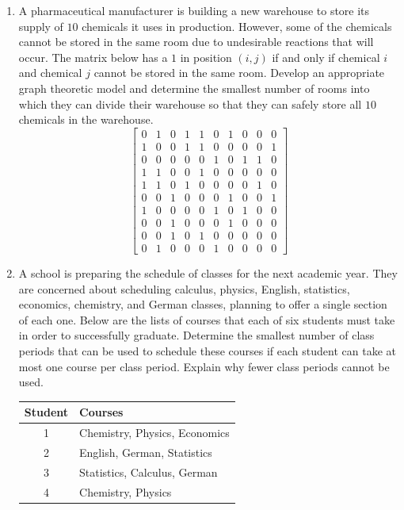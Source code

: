 \begin{enumerate}
\item A pharmaceutical manufacturer is building a new warehouse to
  store its supply of $10$ chemicals it uses in production. However,
  some of the chemicals cannot be stored in the same room due to undesirable
  reactions that will occur. The matrix below has a $1$ in position
  $(i,j)$ if and only if chemical $i$ and chemical $j$ cannot be
  stored in the same room. Develop an appropriate graph theoretic
  model and determine the smallest number of rooms into which they can
  divide their warehouse so that they can safely store all $10$
  chemicals in the warehouse.
  \[
  \begin{bmatrix}
    0 & 1 & 0 & 1 & 1 & 0 & 1 & 0 & 0 & 0\\
    1 & 0 & 0 & 1 & 1 & 0 & 0 & 0 & 0 & 1\\
    0 & 0 & 0 & 0 & 0 & 1 & 0 & 1 & 1 & 0\\
    1 & 1 & 0 & 0 & 1 & 0 & 0 & 0 & 0 & 0\\
    1 & 1 & 0 & 1 & 0 & 0 & 0 & 0 & 1 & 0\\
    0 & 0 & 1 & 0 & 0 & 0 & 1 & 0 & 0 & 1\\
    1 & 0 & 0 & 0 & 0 & 1 & 0 & 1 & 0 & 0\\
    0 & 0 & 1 & 0 & 0 & 0 & 1 & 0 & 0 & 0\\
    0 & 0 & 1 & 0 & 1 & 0 & 0 & 0 & 0 & 0\\
    0 & 1 & 0 & 0 & 0 & 1 & 0 & 0 & 0 & 0
  \end{bmatrix}
  \]
\item A school is preparing the schedule of classes for the next
  academic year. They are concerned about scheduling calculus,
  physics, English, statistics, economics, chemistry, and German
  classes, planning to offer a single section of each one. Below are
  the lists of courses that each of six students must take in order to
  successfully graduate. Determine the smallest number of class
  periods that can be used to schedule these courses if each student
  can take at most one course per class period. Explain why fewer
  class periods cannot be used.
  \begin{center}
    \begin{tabular}{c|l}
      Student & Courses\\\hline
      1 & Chemistry, Physics, Economics\\
      2 & English, German, Statistics\\
      3 & Statistics, Calculus, German\\
      4 & Chemistry, Physics\\

\end{tabular}
\end{center}
\end{enumerate}
